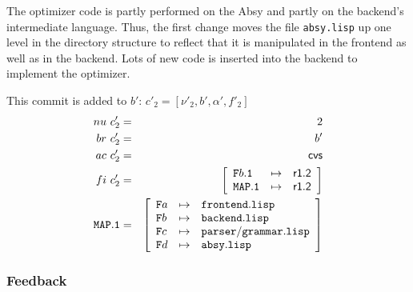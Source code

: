 \documentclass[fleqn, 10pt, a4paper]{article}
\begin{document}
The optimizer code is partly performed on the Absy and partly
on the backend's intermediate language. Thus, the first change
moves the file \texttt{absy.lisp} up one level in the directory
structure to reflect that it is manipulated in the frontend
as well as in the backend. Lots of new code is inserted into
the backend to implement the optimizer.

This commit is added to $b'$: $c'_2=[\nu'_2, b', \alpha', f'_2]$
\begin{eqnarray*}
\mathnormal{nu}\ c'_2 &=& 2 \\
\mathnormal{br}\ c'_2 &=& b' \\
\mathnormal{ac}\ c'_2 &=& \mathsf{cvs} \\
\mathnormal{fi}\ c'_2 &=& \left[
\begin{array}{lcl}
\mathtt{F}b\mathtt{.1} & \mapsto & \mathsf{r1.2} \\
\mathtt{MAP.1}         & \mapsto & \mathsf{r1.2} \\
\end{array}\right] \\
\mathtt{MAP.1} &=& \left[
\begin{array}{lcl}
\mathtt{F}a &\mapsto& \mathtt{frontend.lisp} \\
\mathtt{F}b &\mapsto& \mathtt{backend.lisp} \\
\mathtt{F}c &\mapsto& \mathtt{parser/grammar.lisp} \\
\mathtt{F}d &\mapsto& \mathtt{absy.lisp} \\
\end{array}\right]
\end{eqnarray*}

\subsubsection{Feedback}
\end{document}
